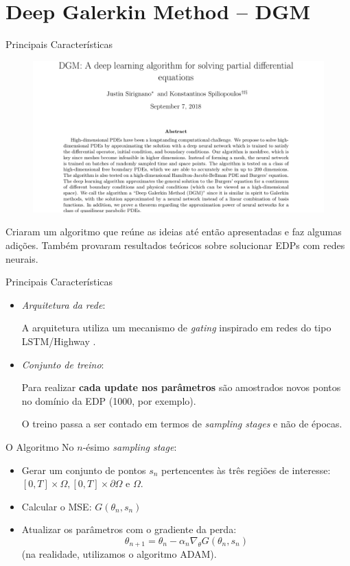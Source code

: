 \documentclass[13pt]{beamer}
\begin{document}
\section{Deep Galerkin Method -- DGM}

\begin{frame}{Principais Características}
    \begin{figure}[htb]
        \includegraphics[width=.75\textwidth]{../figuras/dgm.png}
    \end{figure}
    \cite{sirignano18} Criaram um algoritmo que reúne as ideias até então apresentadas e faz algumas adições.
    Também provaram resultados teóricos sobre solucionar EDPs com redes neurais.
\end{frame}

\begin{frame}{Principais Características}
    \begin{itemize}
        \item<1-> \emph{Arquitetura da rede}:

            A arquitetura utiliza um mecanismo de \emph{gating} inspirado em redes do tipo LSTM/Highway \cite{hochreiter97} \cite{srivastava15}.

        \item<2-> \emph{Conjunto de treino}:

            Para realizar \textbf{cada update nos parâmetros} são amostrados novos pontos no domínio da EDP (1000, por exemplo).

            O treino passa a ser contado em termos de \emph{sampling stages} e não de épocas.
    \end{itemize}
\end{frame}

\begin{frame}{O Algoritmo}
    No \( n \)-ésimo \emph{sampling stage}:
    \begin{itemize}
        \item<1-> Gerar um conjunto de pontos \( s_{ n } \) pertencentes às três regiões de interesse: \( [0, T] \times \Omega, [0, T] \times \partial \Omega \) e \( \Omega \).
        \item<2-> Calcular o MSE: \( G ( \theta_{ n }, s_{ n } ) \)
        \item<3-> Atualizar os parâmetros com o gradiente da perda:
            \begin{equation*}
                \theta_{ n+1 } = \theta_{ n } - \alpha_{ n } \nabla_{ \theta } G ( \theta_{ n }, s_{ n } )
            \end{equation*}
            (na realidade, utilizamos o algoritmo ADAM).
    \end{itemize}
\end{frame}
\end{document}
